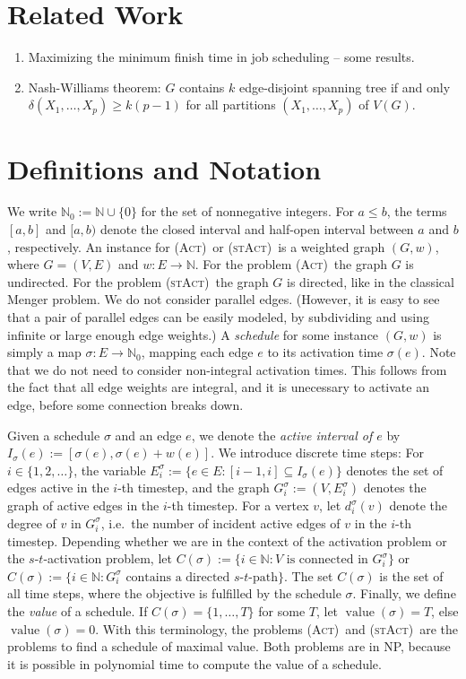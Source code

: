 \documentclass[10pt,a4paper]{article}
\numberwithin{equation}{section}
\newcommand{\N}{\mathbb{N}}
\newcommand{\set}[1]{\{ #1 \}}
\newcommand{\fromto}[2]{\set{#1, \ldots, #2}}
\newcommand{\act}{\textsc{(Act)}}
\newcommand{\stact}{\textsc{(stAct)}}
\DeclareMathOperator{\val}{\text{value}}
\begin{document}
\section{Related Work}

\begin{enumerate}
\item Maximizing the minimum finish time in job scheduling -- some results.
\item Nash-Williams theorem: $G$ contains $k$ edge-disjoint spanning tree if and only $\delta(X_1, \dots, X_p) \geq k(p - 1)$ for all partitions $(X_1, \dots, X_p)$ of $V(G)$. 
\end{enumerate}

\section{Definitions and Notation}
\label{sec_notation}

We write $\N_0 := \N \cup \set{0}$ for the set of nonnegative integers. For $a \leq b$, the terms $[a, b]$ and $[a, b)$ denote the closed interval and half-open interval between $a$ and $b$, respectively. An instance for \act\ or \stact\ is a weighted graph $(G, w)$, where $G = (V, E)$ and $w : E \rightarrow \N$. For the problem \act\ the graph $G$ is undirected. For the problem \stact\ the graph $G$ is directed, like in the classical Menger problem. We do not consider parallel edges. (However, it is easy to see that a pair of parallel edges can be easily modeled, by subdividing and using infinite or large enough edge weights.) A \emph{schedule} for some instance $(G, w)$ is simply a map $\sigma : E \rightarrow \N_0$, mapping each edge $e$ to its activation time $\sigma(e)$. Note that we do not need to consider non-integral activation times. This follows from the fact that all edge weights are integral, and it is unecessary to activate an edge, before some connection breaks down.

Given a schedule $\sigma$ and an edge $e$, we denote the \emph{active interval of $e$} by $I_\sigma(e) := [\sigma(e), \sigma(e) + w(e)]$. We introduce discrete time steps: For $i \in \{1, 2, \dots\}$, the variable $E^\sigma_i := \set{e \in E : [i-1, i] \subseteq I_\sigma(e)}$ denotes the set of edges active in the $i$-th timestep, and the graph $G^\sigma_i := (V, E^\sigma_i)$ denotes the graph of active edges in the $i$-th timestep. For a vertex $v$, let $d^\sigma_i(v)$ denote the degree of $v$ in $G^\sigma_i$, i.e.\ the number of incident active edges of $v$ in the $i$-th timestep.
Depending whether we are in the context of the activation problem or the $s$-$t$-activation problem, let $C(\sigma) := \set{i \in \N : V \text{ is connected in } G^\sigma_i}$ or  $C(\sigma) := \set{i \in \N : G_i^\sigma \text{ contains a directed $s$-$t$-path}}$. The set $C(\sigma)$ is the set of all time steps, where the objective is fulfilled by the schedule $\sigma$. Finally, we define the \emph{value} of a schedule. If $C(\sigma) = \fromto{1}{T}$ for some $T$, let $\val(\sigma) = T$, else $\val(\sigma) = 0$.
With this terminology, the problems \act\ and \stact\ are the problems to find a schedule of maximal value. Both problems are in NP, because it is possible in polynomial time to compute the value of a schedule. 
\end{document}
